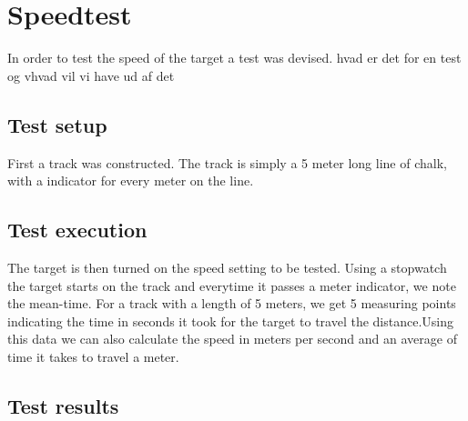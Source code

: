 \section{Speedtest}\label{speedotesto}
In order to test the speed of the target a test was devised.
hvad er det for en test og vhvad vil vi have ud af det
\subsection{Test setup}
First a track was constructed. The track is simply a 5 meter long line of chalk,
with a indicator for every meter on the line.
\subsection{Test execution}
The target is then turned on the speed setting to be tested. Using a stopwatch
the target starts on the track and everytime it passes a meter indicator, we note
the mean-time. For a track with a length of 5 meters, we get 5 measuring points indicating
the time in seconds it took for the target to travel the distance.Using this data
we can also calculate the speed in meters per second and an average of time it takes to
travel a meter.
\subsection{Test results}


